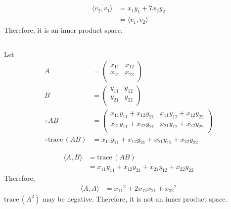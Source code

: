 \documentclass[fleqn, a4paper, draft]{amsart}
\theoremstyle{definition}
\theoremstyle{theorem}
\theoremstyle{remark}
\newcommand{\trace}{\mathrm{trace\,}}
\numberwithin{corollary}{theorem}
\numberwithin{equation}{theorem}
\begin{document}
\begin{align*}
	\overline{\langle v_2, v_1 \rangle} &= x_1 y_1 + 7 x_2 y_2\\
	&= \langle v_1, v_2 \rangle
\end{align*}
Therefore, it is an inner product space.

\subsection{}

Let
\begin{align*}
	A &=
		\begin{pmatrix}
			x_{11} & x_{12}\\
			x_{21} & x_{22}\\
		\end{pmatrix}\\
	B &=
		\begin{pmatrix}
			y_{11} & y_{12}\\
			y_{21} & y_{22}\\
		\end{pmatrix}\\
	\therefore AB &= 
		\begin{pmatrix}
			x_{11} y_{11} + x_{12} y_{21} & x_{11} y_{12} + x_{12} y_{22}\\
			x_{21} y_{11} + x_{22} y_{21} & x_{21} y_{12} + x_{22} y_{22}\\
		\end{pmatrix}\\
	\therefore \trace(AB) &= x_{11} y_{11} + x_{12} y_{21} + x_{21} y_{12} + x_{22} y_{22}
\end{align*}

\begin{align*}
	\langle A, B \rangle &= \trace(AB)\\
	&= x_{11} y_{11} + x_{12} y_{21} + x_{21} y_{12} + x_{22} y_{22}
\end{align*}
Therefore,
\begin{align*}
	\langle A, A \rangle &= {x_{11}}^2 + 2 x_{12} x_{21} + {x_{22}}^2
\end{align*}
$\trace(A^2)$ may be negative. Therefore, it is not an inner product space.

\end{document}
